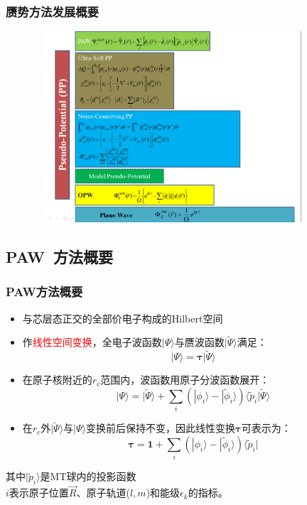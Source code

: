 \documentclass[cjk,slidestop,compress,mathserif,blue]{beamer}
\begin{document}
\frame
{
	\frametitle{赝势方法发展概要}
\begin{figure}[h!]
\centering
\vspace*{-0.25in}
\includegraphics[height=2.80in,width=4.10in,viewport=0 0 1190 875,clip]{Figures/Pseudo_Potential.png}
\label{Pseudo_Poential}
\end{figure}
}

\subsection{\rm{PAW~}方法概要}
\frame
{
	\frametitle{\textrm{PAW}方法概要}
\begin{itemize}
	\item 与芯层态正交的全部价电子构成的\textrm{Hilbert}空间%
	\item 作\textcolor{red}{线性空间变换}，全电子波函数$|\Psi\rangle$与赝波函数$|\tilde\Psi\rangle$满足：
		$$|\Psi\rangle=\mathbf{\tau|}\tilde\Psi\rangle$$
	\item 在原子核附近的$r_c$范围内，波函数用原子分波函数展开：
	$$|\Psi\rangle=|\tilde\Psi\rangle+\sum_i(|\phi_i\rangle-|\tilde\phi_i\rangle)\langle\tilde p_i|\tilde\Psi\rangle$$
	\item 在$r_c$外$|\tilde\Psi\rangle$与$|\Psi\rangle$变换前后保持不变，因此线性变换$\mathbf{\tau}$可表示为：
	$$\mathbf{\tau}=\mathbf{1}+\sum_i(|\phi_i\rangle-|\tilde\phi_i\rangle)\langle\tilde p_i|$$
\end{itemize}
其中$|\tilde p_i\rangle$是\textrm{MT}球内的投影函数\\
$i$表示原子位置$\vec R$、原子轨道($l,m$)和能级$\epsilon_k$的指标。
}
\end{document}

